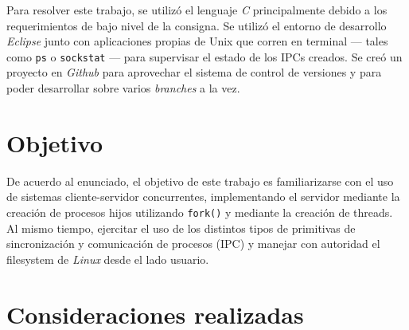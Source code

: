 \documentclass[a4paper, 10pt]{article}
\begin{document}
Para resolver este trabajo, se utilizó el lenguaje \textit{C} principalmente debido a los requerimientos de bajo nivel de la consigna. Se utilizó el entorno de desarrollo \textit{Eclipse} junto con aplicaciones propias de Unix que corren en terminal --- tales como {\tt ps} o {\tt sockstat} --- para supervisar el estado de los IPCs creados. Se creó un proyecto en \textit{Github} para aprovechar el sistema de control de versiones y para poder desarrollar sobre varios \textit{branches} a la vez.\\

\section{Objetivo}

De acuerdo al enunciado, el objetivo de este trabajo es familiarizarse con el uso de sistemas cliente-servidor concurrentes, implementando el servidor mediante la creación de procesos hijos utilizando {\tt fork()} y mediante la creación de threads. Al mismo tiempo, ejercitar el uso de los distintos tipos de primitivas de sincronización y comunicación de procesos (IPC) y manejar con autoridad el filesystem de \textit{Linux} desde el lado usuario.\\

\section{Consideraciones realizadas}
\end{document}
